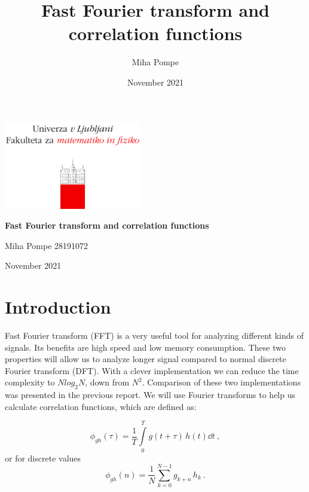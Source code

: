 \documentclass[12pt, a4paper]{article}
\title{Fast Fourier transform and correlation functions}
\author{Miha Pompe}
\date{November 2021}
\begin{document}
\begin{titlepage}
	\centering
 	\includegraphics[width=0.45\textwidth]{logo_fmf_uni-lj_sl_veliki.png}\par\vspace{1cm}

	\vspace{1cm}

	\vspace{1.5cm}
	{\huge\bfseries Fast Fourier transform and correlation functions\par}
	\vspace{2cm}
	{\Large Miha Pompe 28191072\par}
	\vfill

	\vfill

	{\large November 2021\par}
\end{titlepage}
\thispagestyle{empty}
\clearpage
{}
\newpage


\section{Introduction}
Fast Fourier transform (FFT) is a very useful tool for analyzing different kinds of signals. Its benefits are high speed and low memory consumption. These two properties will allow us to analyze longer signal compared to normal discrete Fourier transform (DFT). With a clever implementation we can reduce the time complexity to $N log_2N$, down from $N^2$. Comparison of these two implementations was presented in the previous report. We will use Fourier transforms to help us calculate correlation functions, which are defined as:

\begin{equation*}
  \phi_{gh}(\tau)=\frac{1}{T}\int\limits_0^{T} g(t+\tau)\,h(t)\dd t \>,  
\end{equation*}
or for discrete values
\begin{equation*}
  \phi_{gh}(n)= \frac{1}{N}\sum_{k=0}^{N-1} g_{k+n}\, h_k \>.
\end{equation*}
\end{document}
